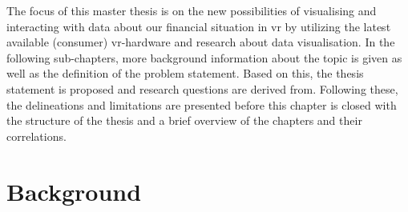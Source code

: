 The focus of this master thesis is on the new possibilities of visualising and interacting with data about our financial situation in \gls{vr} by utilizing the latest available (consumer) \gls{vr}-hardware and research about data visualisation. \newline
In the following sub-chapters, more background information about the topic is given as well as the definition of the problem statement. Based on this, the thesis statement is proposed and research questions are derived from. Following these, the delineations and limitations are presented before this chapter is closed with the structure of the thesis and a brief overview of the chapters and their correlations.



\section{Background}

